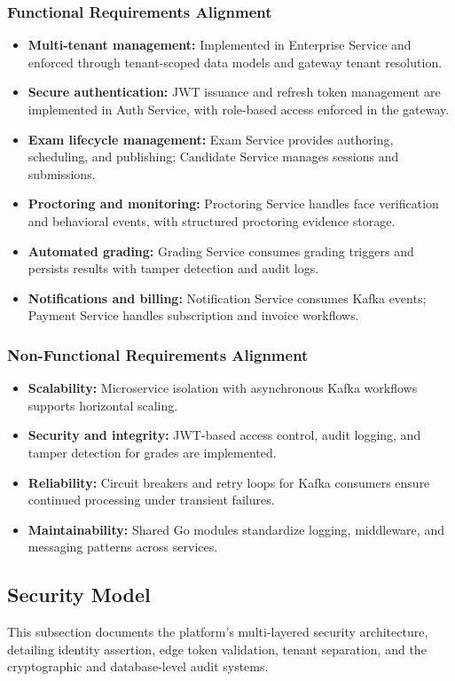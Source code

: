 \subsubsection{Functional Requirements Alignment}
\begin{itemize}
    \item \textbf{Multi-tenant management:} Implemented in Enterprise Service and enforced through tenant-scoped data models and gateway tenant resolution.
    \item \textbf{Secure authentication:} JWT issuance and refresh token management are implemented in Auth Service, with role-based access enforced in the gateway.
    \item \textbf{Exam lifecycle management:} Exam Service provides authoring, scheduling, and publishing; Candidate Service manages sessions and submissions.
    \item \textbf{Proctoring and monitoring:} Proctoring Service handles face verification and behavioral events, with structured proctoring evidence storage.
    \item \textbf{Automated grading:} Grading Service consumes grading triggers and persists results with tamper detection and audit logs.
    \item \textbf{Notifications and billing:} Notification Service consumes Kafka events; Payment Service handles subscription and invoice workflows.
\end{itemize}

\subsubsection{Non-Functional Requirements Alignment}
\begin{itemize}
    \item \textbf{Scalability:} Microservice isolation with asynchronous Kafka workflows supports horizontal scaling.
    \item \textbf{Security and integrity:} JWT-based access control, audit logging, and tamper detection for grades are implemented.
    \item \textbf{Reliability:} Circuit breakers and retry loops for Kafka consumers ensure continued processing under transient failures.
    \item \textbf{Maintainability:} Shared Go modules standardize logging, middleware, and messaging patterns across services.
\end{itemize}

\subsection{Security Model}
This subsection documents the platform's multi-layered security architecture, detailing identity assertion, edge token validation, tenant separation, and the cryptographic and database-level audit systems.

